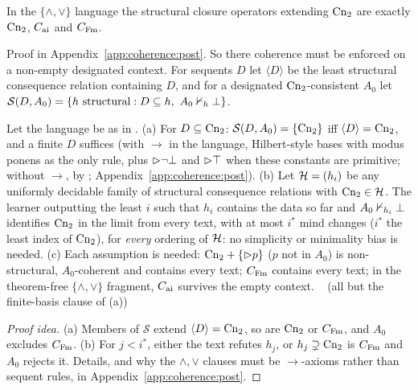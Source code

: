 \begin{proposition}\label{prop:coherence:almost}
In the $\{\wedge,\vee\}$ language the structural closure operators extending $\mathrm{Cn}_2$ are exactly $\mathrm{Cn}_2$, $C_{\mathrm{ai}}$ and $C_{\mathrm{Fm}}$.
\end{proposition}

Proof in Appendix~\ref{app:coherence:post}. So there coherence must be enforced on a non-empty designated context. For sequents $D$ let $\langle D\rangle$ be the least structural consequence relation containing $D$, and for a designated $\mathrm{Cn}_2$-consistent $A_0$ let $\mathcal S(D,A_0)=\{h\text{ structural}:D\subseteq h,\ A_0\nvdash_h\bot\}$.

\begin{theorem}\label{thm:coherence:cpc}
Let the language be as in .
\textup{(a)} For $D\subseteq\mathrm{Cn}_2$: $\mathcal S(D,A_0)=\{\mathrm{Cn}_2\}$ iff $\langle D\rangle=\mathrm{Cn}_2$, and a finite $D$ suffices (with $\to$ in the language, Hilbert-style bases with modus ponens as the only rule, plus $\rhd\neg\bot$ and $\rhd\top$ when these constants are primitive; without $\to$, by \citealt{rautenberg1981two}; Appendix~\ref{app:coherence:post}).
\textup{(b)} Let $\mathcal{H}=(h_i)$ be any uniformly decidable family of structural consequence relations with $\mathrm{Cn}_2\in\mathcal{H}$. The learner outputting the least $i$ such that $h_i$ contains the data so far and $A_0\nvdash_{h_i}\bot$ identifies $\mathrm{Cn}_2$ in the limit from every text, with at most $i^*$ mind changes ($i^*$ the least index of $\mathrm{Cn}_2$), for \emph{every} ordering of $\mathcal{H}$: no simplicity or minimality bias is needed.
\textup{(c)} Each assumption is needed: $\mathrm{Cn}_2+\{\rhd p\}$ ($p$ not in $A_0$) is non-structural, $A_0$-coherent and contains every text; $C_{\mathrm{Fm}}$ contains every text; in the theorem-free $\{\wedge,\vee\}$ fragment, $C_{\mathrm{ai}}$ survives the empty context. \hfill{}\  (all but the finite-basis clause of (a))
\end{theorem}

\begin{proof}[Proof idea]
(a) Members of $\mathcal S$ extend $\langle D\rangle=\mathrm{Cn}_2$, so are $\mathrm{Cn}_2$ or $C_{\mathrm{Fm}}$, and $A_0$ excludes $C_{\mathrm{Fm}}$. (b) For $j<i^*$, either the text refutes $h_j$, or $h_j\supsetneq\mathrm{Cn}_2$ is $C_{\mathrm{Fm}}$ and $A_0$ rejects it. Details, and why the $\wedge,\vee$ clauses must be $\to$-axioms rather than sequent rules, in Appendix~\ref{app:coherence:post}.
\end{proof}

